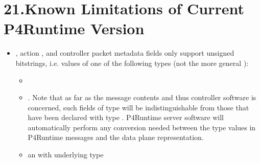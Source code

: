 \documentclass[11pt]{article}
\begin{document}
{%
\section{21.\hspace*{0.5em}Known Limitations of Current P4Runtime Version}\label{sec-known-limitations-of-current-p4runtime-version}%

\begin{itemize}%

\item{}
, action , and controller packet metadata fields only
support unsigned bitstrings, i.e. values of one of the following types (not
the more general ):%

\begin{itemize}[noitemsep,topsep=\mdcompacttopsep]%

\item{}%

\item{}.  Note that as far as the  message contents and
thus controller software is concerned, such fields of type 
will be indistinguishable from those that have been declared with
type .  P4Runtime server software will automatically
perform any conversion needed between the type  values in
P4Runtime messages and the data plane representation.%

\item{}an  with underlying type %


\end{itemize}
\end{itemize}}
\end{document}
